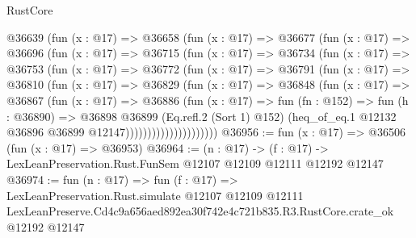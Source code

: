 \begin{lexlean}{RustCore}
\begin{coremodule}
              @36639
                (fun (x : @17) =>
                @36658
                  (fun (x : @17) =>
                  @36677
                    (fun (x : @17) =>
                    @36696
                      (fun (x : @17) =>
                      @36715
                        (fun (x : @17) =>
                        @36734
                          (fun (x : @17) =>
                          @36753
                            (fun (x : @17) =>
                            @36772
                              (fun (x : @17) =>
                              @36791
                                (fun (x : @17) =>
                                @36810
                                  (fun (x : @17) =>
                                  @36829
                                    (fun (x : @17) =>
                                    @36848
                                      (fun (x : @17) =>
                                      @36867
                                        (fun (x : @17) =>
                                        @36886
                                          (fun (x : @17) =>
                                          fun (fn : @152) =>
                                          fun (h : @36890) =>
                                          @36898
                                            @36899
                                            (Eq.refl.{2} (Sort 1) @152)
                                            (heq_of_eq.{1}
                                              @12132
                                              @36896
                                              @36899
                                              @12147)))))))))))))))))))))
@36956 := fun (x : @17) => @36506 (fun (x : @17) => @36953)
@36964 := (n : @17) ->
  (f : @17) -> LexLeanPreservation.Rust.FunSem @12107 @12109 @12111 @12192 @12147
@36974 := fun (n : @17) =>
  fun (f : @17) =>
  LexLeanPreservation.Rust.simulate
    @12107
    @12109
    @12111
    LexLeanPreserve.Cd4c9a656aed892ea30f742e4c721b835.R3.RustCore.crate_ok
    @12192
    @12147
\end{coremodule}
\end{lexlean}
